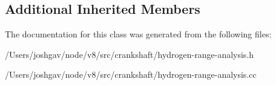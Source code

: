 \subsection*{Additional Inherited Members}


The documentation for this class was generated from the following files\+:\begin{DoxyCompactItemize}
\item 
/\+Users/joshgav/node/v8/src/crankshaft/hydrogen-\/range-\/analysis.\+h\item 
/\+Users/joshgav/node/v8/src/crankshaft/hydrogen-\/range-\/analysis.\+cc\end{DoxyCompactItemize}
